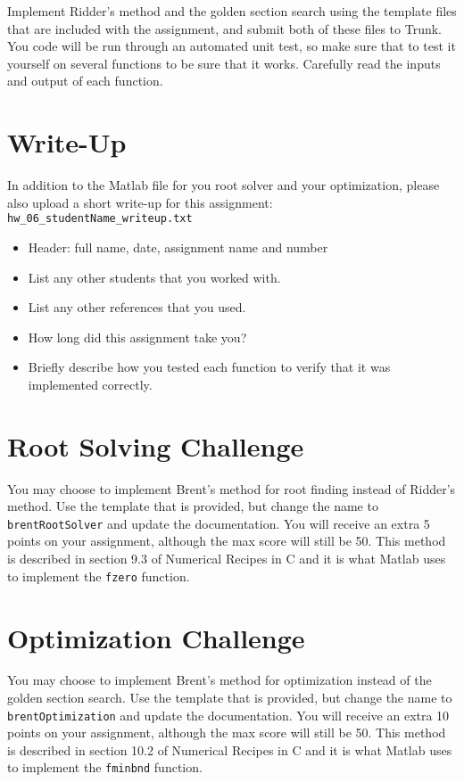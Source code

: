 Implement Ridder's method and the golden section search
using the template files that are included with the assignment,
and submit both of these files to Trunk.
You code will be run through an automated unit test,
so make sure that to test it yourself on several functions to be sure that it works.
Carefully read the inputs and output of each function.

\section*{Write-Up}

In addition to the Matlab file for you root solver and your optimization,
please also upload a short write-up for this assignment: \\
\texttt{hw\_06\_studentName\_writeup.txt}
\vspace{-0.0em} \begin{itemize}  \setlength\itemsep{0em} \setlength\itemindent{18pt}
  \item Header: full name, date, assignment name and number
  \item List any other students that you worked with.
  \item List any other references that you used.
  \item How long did this assignment take you?
  \item Briefly describe how you tested each function to verify that it was implemented correctly.
\end{itemize}

\section*{Root Solving Challenge}

You may choose to implement Brent's method for root finding instead of Ridder's method.
Use the template that is provided,
but change the name to \texttt{brentRootSolver} and update the documentation.
You will receive an extra 5 points on your assignment, although the max score will still be 50.
This method is described in section 9.3 of Numerical Recipes in C and it is what
Matlab uses to implement the \texttt{fzero} function.

\section*{Optimization Challenge}

You may choose to implement Brent's method for optimization instead of the golden section search.
Use the template that is provided,
but change the name to \texttt{brentOptimization} and update the documentation.
You will receive an extra 10 points on your assignment, although the max score will still be 50.
This method is described in section 10.2 of Numerical Recipes in C and it is what
Matlab uses to implement the \texttt{fminbnd} function.

\pagebreak


\pagebreak



